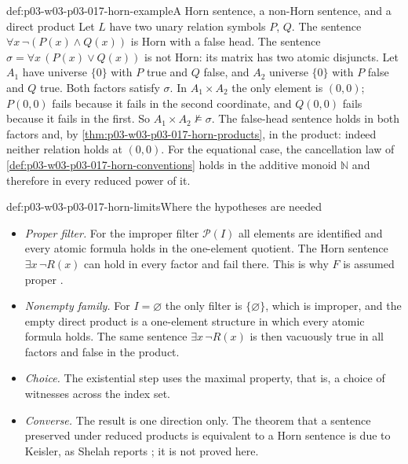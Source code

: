 \begin{hbexample}{def:p03-w03-p03-017-horn-example}{A Horn sentence, a non-Horn sentence, and a direct product}
Let \(L\) have two unary relation symbols \(P\), \(Q\).  The sentence
\(\forall x\,\neg(P(x)\wedge Q(x))\) is Horn with a false head.  The sentence
\(\sigma=\forall x\,(P(x)\vee Q(x))\) is not Horn: its matrix has two atomic
disjuncts.  Let \(A_1\) have universe \(\{0\}\) with \(P\) true and \(Q\)
false, and \(A_2\) universe \(\{0\}\) with \(P\) false and \(Q\) true.  Both
factors satisfy \(\sigma\).  In \(A_1\times A_2\) the only element is
\((0,0)\); \(P(0,0)\) fails because it fails in the second coordinate, and
\(Q(0,0)\) fails because it fails in the first.  So
\(A_1\times A_2\not\models\sigma\).  The false-head sentence holds in both
factors and, by \cref{thm:p03-w03-p03-017-horn-products}, in the product:
indeed neither relation holds at \((0,0)\).  For the equational case, the
cancellation law of \cref{def:p03-w03-p03-017-horn-conventions} holds in the
additive monoid \(\mathbb N\) and therefore in every reduced power of it.
\end{hbexample}

\begin{hbwarning}{def:p03-w03-p03-017-horn-limits}{Where the hypotheses are needed}
\begin{itemize}
  \item \emph{Proper filter.}  For the improper filter \(\mathcal P(I)\) all
        elements are identified and every atomic formula holds in the
        one-element quotient.  The Horn sentence
        \(\exists x\,\neg R(x)\) can hold in every factor and fail there.
        This is why \(F\) is assumed proper
        \cite[V\S2, Definition~2.1, p.~205]{BurrisSankappanavar2012}.
  \item \emph{Nonempty family.}  For \(I=\varnothing\) the only filter is
        \(\{\varnothing\}\), which is improper, and the empty direct product
        is a one-element structure in which every atomic formula holds.  The
        same sentence \(\exists x\,\neg R(x)\) is then vacuously true in all
        factors and false in the product.
  \item \emph{Choice.}  The existential step uses the maximal property,
        that is, a choice of witnesses across the index set.
  \item \emph{Converse.}  The result is one direction only.  The theorem
        that a sentence preserved under reduced products is equivalent to a
        Horn sentence is due to Keisler, as Shelah reports
        \cite[p.~225]{Shelah1971Ultrapowers}; it is not proved here.
\end{itemize}
\end{hbwarning}

